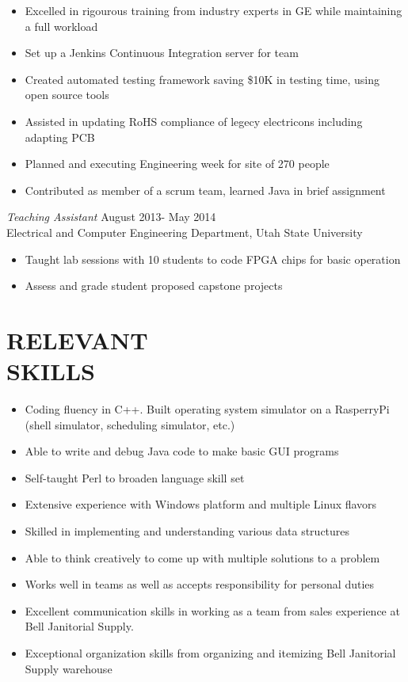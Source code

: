 \documentclass[line,margin]{res}
\begin{document}
\begin{resume}
\begin{itemize}
		\item Excelled in rigourous training from industry experts in GE while maintaining a full workload
		\item Set up a Jenkins Continuous Integration server for team
		\item Created automated testing framework saving \$10K in testing time, using open source tools
		\item Assisted in updating RoHS compliance of legecy electricons including adapting PCB
		\item Planned and executing Engineering week for site of 270 people
		\item Contributed as member of a scrum team, learned Java in brief assignment
	\end{itemize}
	{\sl Teaching Assistant} \hfill August 2013- May 2014 \\
	Electrical and Computer Engineering Department, Utah State University
	\begin{itemize}  \itemsep -2pt %
		\item Taught lab sessions with 10 students to code FPGA chips for
		      basic operation
		\item Assess and grade student proposed capstone projects
	\end{itemize}

	\section{RELEVANT\\SKILLS}
	\begin{itemize}
		\item Coding fluency in C++. Built operating system simulator on
		      a RasperryPi (shell simulator, scheduling simulator, etc.)
		\item Able to write and debug Java code to make basic GUI programs
		\item Self-taught Perl to broaden language skill set
		\item Extensive experience with Windows platform and multiple Linux flavors
		\item Skilled in implementing and understanding various data structures
		\item Able to think creatively to come up with multiple solutions to a problem
		\item Works well in teams as well as accepts responsibility for personal duties
		\item Excellent communication skills in working as a team from sales experience
		      at Bell Janitorial Supply.
		\item Exceptional organization skills from organizing and itemizing Bell 								Janitorial Supply warehouse
	\end{itemize}


\end{resume}
\end{document}
